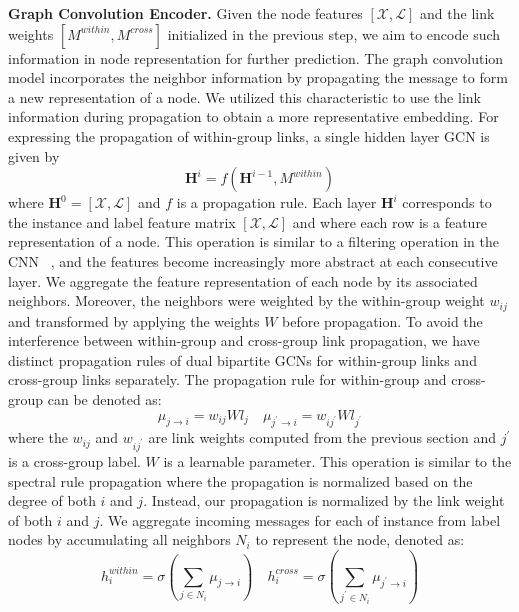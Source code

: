 \documentclass[letterpaper]{article} \usepackage{aaai20}  \usepackage{times}  \usepackage{helvet} \usepackage{courier}  \usepackage[hyphens]{url}  \usepackage{graphicx} \urlstyle{rm} \def\UrlFont{\rm}  \frenchspacing  \setlength{\pdfpagewidth}{8.5in}  \setlength{\pdfpageheight}{11in}  \frenchspacing
\begin{document}
\noindent\textbf{Graph Convolution Encoder.}
Given the node features $[\mathcal{X},\mathcal{L}]$ and the link weights $[M^{within}, M^{cross}]$ initialized in the previous step, we aim to encode such information in node representation for further prediction.
The graph convolution model incorporates the neighbor information by propagating the message to form a new representation of a node. We utilized this characteristic to use the link information during propagation to obtain a more representative embedding. 
For expressing the propagation of within-group links, a single hidden layer GCN is given by
\begin{equation}
\boldsymbol{H}^i=f(\boldsymbol{H}^{i-1},M^{within})
\end{equation}
where $\boldsymbol{H}^0 = [\mathcal{X},\mathcal{L}]$ and $f$ is a propagation rule. Each layer $\boldsymbol{H}^i$ corresponds to the instance and label feature matrix $[\mathcal{X}, \mathcal{L}]$ and where each row is a feature representation of a node. 
This operation is similar to a filtering operation in the CNN ~\cite{lecun1995convolutional}, and the features become increasingly more abstract at each consecutive layer. We aggregate the feature representation of each node by its associated neighbors. Moreover, the neighbors were weighted by the within-group weight $w_{ij}$ and transformed by applying the weights $W$ before propagation. 
 To avoid the interference between within-group and cross-group link propagation, we have distinct propagation rules of dual bipartite GCNs for within-group links and cross-group links separately.
 The propagation rule for within-group and cross-group can be denoted as: 
\begin{equation}
\mu_{j \rightarrow i} = w_{ij} W l_j  \quad
\mu_{j^{\prime} \rightarrow i} = w_{ij^{\prime}} W l_{j^{\prime}} 
\end{equation}
where the $w_{ij}$ and $w_{ij^{\prime}}$ are link weights computed from the previous section and $j^\prime$ is a cross-group label. $W$ is a learnable parameter.
This operation is similar to the spectral rule propagation \cite{kipf2016semi} where the propagation is normalized based on the degree of both $i$ and $j$. Instead, our propagation is normalized by the link weight of both $i$ and $j$. 
We aggregate incoming messages for each of instance from label nodes by accumulating all neighbors $N_{i}$ to represent the node, denoted as:
\begin{equation}
h_i^{within} = \sigma (\sum_{j \in N_i} \mu_{j \rightarrow i})  \quad
h_i^{cross} = \sigma (\sum_{j^{\prime} \in N_i} \mu_{j^{\prime} \rightarrow i})  
\end{equation}
\end{document}
